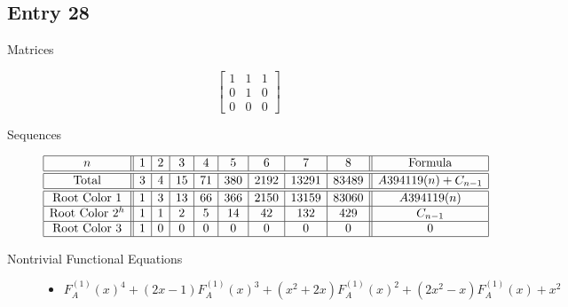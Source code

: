 \documentclass[12pt]{amsart}
\newcommand{\gff}[2]{F_{#2}^{(#1)}(x)}
\newcommand{\gfa}[1]{\gff{#1}{A}}
\begin{document}
\subsection*{Entry 28}
\begin{description}
    \item[Matrices]
    
    \[\begin{bmatrix}
1 & 1 & 1 \\
0 & 1 & 0 \\
0 & 0 & 0
\end{bmatrix}\]
    \item[Sequences]\hspace*{\fill}\vspace{-0.5cm}
    \begin{center}
        \[
        \begin{array}{|c||c|c|c|c|c|c|c|c||c|}\hline
           n  & 1 & 2 & 3 & 4 & 5 & 6 & 7 & 8  & \text{Formula}\\\hline\hline
           \text{Total}  & 3 & 4 & 15 & 71 & 380 & 2192 & 13291 & 83489 & A394119(n)+C_{n-1}\\\hline\hline
           \text{Root Color }1 & 1 & 3 & 13 & 66 & 366 & 2150 & 13159 & 83060 & A394119(n)\\\hline
           \text{Root Color }2^h & 1 & 1 & 2 & 5 & 14 & 42 & 132 & 429 & C_{n-1}\\\hline
           \text{Root Color }3 & 1 & 0 & 0 & 0 & 0 & 0 & 0 & 0 & 0\\\hline
        \end{array}
        \]
    \end{center}
    
    \item[Nontrivial Functional Equations]\hspace*{\fill}

    \begin{itemize}
\item $\gfa{1}^4+(2x - 1)\gfa{1}^3+(x^2 + 2x)\gfa{1}^2+(2x^2 - x)\gfa{1}+x^2$

\end{itemize}
    
\end{description}
\end{document}
